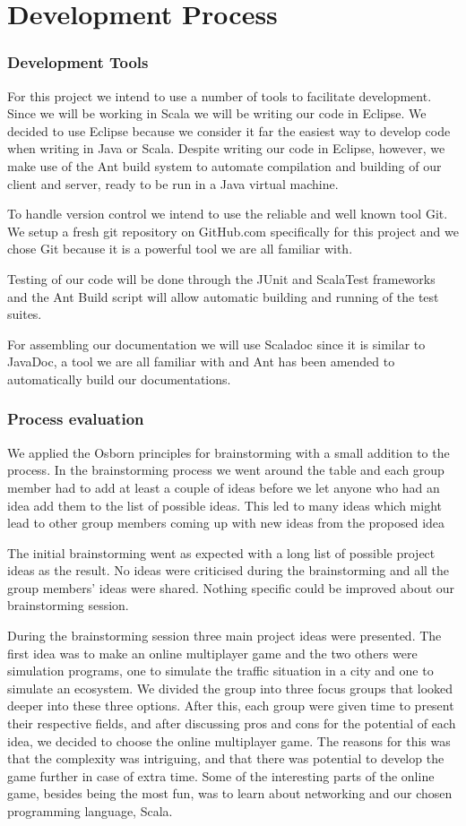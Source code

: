 \documentclass[a4paper]{article}
\begin{document}
\part{Development Process}
\section{Development Tools}
For this project we intend to use a number of tools to facilitate development.
Since we will be working in Scala we will be writing our code in Eclipse. We decided to use Eclipse because we consider it far the easiest way to develop code 
when writing in Java or Scala. Despite writing our code in Eclipse, however, we make use of the Ant build system to automate compilation and building of our client and server, ready
to be run in a Java virtual machine.
 
To handle version control we intend to use the reliable and well known tool Git. We setup a fresh git repository on GitHub.com specifically for this project and we chose 
Git because it is a powerful tool we are all familiar with.

Testing of our code will be done through the JUnit and ScalaTest frameworks and the Ant Build script will allow automatic building and running of the test suites.

For assembling our documentation we will use Scaladoc since it is similar to JavaDoc, a tool we are all familiar with and Ant has been amended to automatically build our documentations.

\section{Process evaluation}
We applied the Osborn principles for brainstorming with a small addition to the process. In the brainstorming process we went around the table and each group member had 
to add at least a couple of ideas before we let anyone who had an idea add them to the list of possible ideas. This led to many ideas which might lead to other group members 
coming up with new ideas from the proposed idea

The initial brainstorming went as expected with a long list of possible project ideas as the result. No ideas were criticised during the brainstorming and all the group members' 
ideas were shared. Nothing specific could be improved about our brainstorming session. 

During the brainstorming session three main project ideas were presented. The first idea was to make an online multiplayer game and the two others were simulation programs, 
one to simulate the traffic situation in a city and one to simulate an ecosystem. We divided the group into three focus groups that looked deeper into these three options. 
After this, each group were given time to present their respective fields, and after discussing pros and cons for the potential of each idea, we decided to choose the online 
multiplayer game. The reasons for this was that the complexity was intriguing, and that there was potential to develop the game further in case of extra time. Some of the 
interesting parts of the online game, besides being the most fun, was to learn about networking and our chosen programming language, Scala. 
\end{document}
